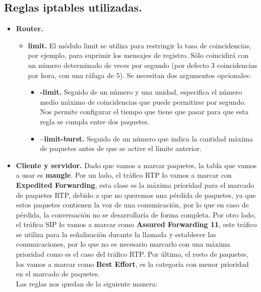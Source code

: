 \documentclass[11pt]{article}
\begin{document}
\subsection{Reglas iptables utilizadas.}
\begin{itemize}
\item \textbf{Router.}
	\begin{itemize}
	En el caso del router hemos utilizado las reglas iptables que vienen dadas en el enunciado de la práctica. Estas son:
\begin{lstlisting}[style=C,numbers=none]		
iptables -t filter -A INPUT -m dscp --dscp 14 -m limit --limit 5/s --limit-burst 5 -j ACCEPT

iptables -t filter -A INPUT -m dscp --dscp 14 -j DROP		
\end{lstlisting}
	Donde los parámetros --limit y --limit-burst significan lo siguiente.
	\item \textbf{limit.} El módulo limit se utiliza para restringir la tasa de coincidencias, por ejemplo, para suprimir los mensajes de registro. Sólo coincidirá con un número determinado de veces por segundo (por defecto 3 coincidencias por hora, con una ráfaga de 5). Se necesitan dos argumentos opcionales: 
		\begin{itemize}
			\item \textbf{-limit.} Seguido de un número y una unidad, especifica el número medio máximo de coincidencias que puede permitirse por segundo. Nos permite configurar el tiempo que tiene que pasar para que esta regla se cumpla entre dos paquetes.
			\item \textbf{--limit-burst.} Seguido de un número que indica la cantidad máxima de paquetes antes de que se active el límite anterior. \\
		\end{itemize}
	\end{itemize}
	
\item \textbf{Cliente y servidor.}
	Dado que vamos a marcar paquetes, la tabla que vamos a usar es \textbf{mangle}. Por un lado, el tráfico RTP lo vamos a marcar con \textbf{Expedited Forwarding}, esta clase es la máxima prioridad para el marcado de paquetes RTP, debido a que no queremos una pérdida de paquetes, ya que estos paquetes contienen la voz de una comunicación, por lo que en caso de pérdida, la conversación no se desarrollaría de forma completa. Por otro lado, el tráfico SIP lo vamos a marcar como \textbf{Assured Forwarding 11}, este tráfico se utiliza para la señalización durante la llamada y establecer las comunicaciones, por lo que no es necesario marcarlo con una máxima prioridad como es el caso del tráfico RTP. Por último, el resto de paquetes, los vamos a marcar  como \textbf{Best Effort}, es la categoría con menor prioridad en el marcado de paquetes. \\
\newpage
Las reglas nos quedan de la siguiente manera:
\begin{itemize}


\end{itemize}
\end{itemize}
\end{document}
